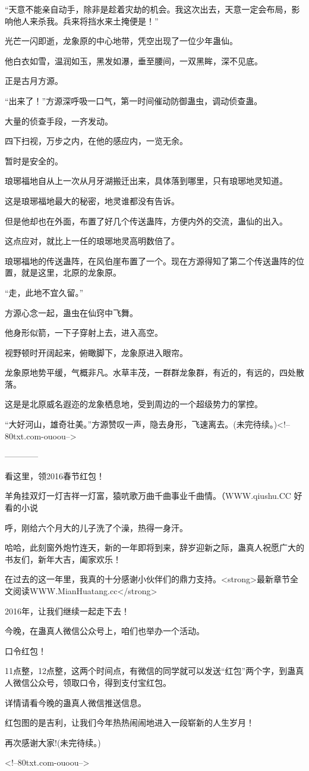 \begin{this_body}
“天意不能亲自动手，除非是趁着灾劫的机会。我这次出去，天意一定会布局，影响他人来杀我。兵来将挡水来土掩便是！”

光芒一闪即逝，龙象原的中心地带，凭空出现了一位少年蛊仙。

他白衣如雪，温润如玉，黑发如瀑，垂至腰间，一双黑眸，深不见底。

正是古月方源。

“出来了！”方源深呼吸一口气，第一时间催动防御蛊虫，调动侦查蛊。

大量的侦查手段，一齐发动。

四下扫视，万步之内，在他的感应内，一览无余。

暂时是安全的。

琅琊福地自从上一次从月牙湖搬迁出来，具体落到哪里，只有琅琊地灵知道。

这是琅琊福地最大的秘密，地灵谁都没有告诉。

但是他却也在外面，布置了好几个传送蛊阵，方便内外的交流，蛊仙的出入。

这点应对，就比上一任的琅琊地灵高明数倍了。

琅琊福地的传送蛊阵，在风伯崖布置了一个。现在方源得知了第二个传送蛊阵的位置，就是这里，北原的龙象原。

“走，此地不宜久留。”

方源心念一起，蛊虫在仙窍中飞舞。

他身形似箭，一下子穿射上去，进入高空。

视野顿时开阔起来，俯瞰脚下，龙象原进入眼帘。

龙象原地势平缓，气概非凡。水草丰茂，一群群龙象群，有近的，有远的，四处散落。

这是是北原威名遐迩的龙象栖息地，受到周边的一个超级势力的掌控。

“大好河山，雄奇壮美。”方源赞叹一声，隐去身形，飞速离去。(未完待续。)<!--80txt.com-ouoou-->

------------

看这里，领2016春节红包！

羊角挂双灯一灯吉祥一灯富，猿吭歌万曲千曲事业千曲情。（WWW.qiushu.CC 好看的小说

呼，刚给六个月大的儿子洗了个澡，热得一身汗。

哈哈，此刻窗外炮竹连天，新的一年即将到来，辞岁迎新之际，蛊真人祝愿广大的书友们，新年大吉，阖家欢乐！

在过去的这一年里，我真的十分感谢小伙伴们的鼎力支持。<strong>最新章节全文阅读WWW.MianHuatang.cc</strong>

2016年，让我们继续一起走下去！

今晚，在蛊真人微信公众号上，咱们也举办一个活动。

口令红包！

11点整，12点整，这两个时间点，有微信的同学就可以发送“红包”两个字，到蛊真人微信公众号，领取口令，得到支付宝红包。

详情请看今晚的蛊真人微信推送信息。

红包图的是吉利，让我们今年热热闹闹地进入一段崭新的人生岁月！

再次感谢大家!(未完待续。)

<!--80txt.com-ouoou-->

\end{this_body}

